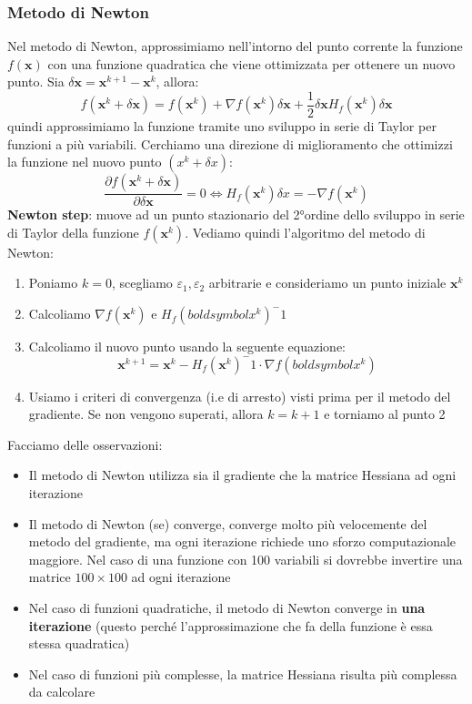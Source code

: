 \documentclass[12pt]{article}
\begin{document}
\subsubsection{Metodo di Newton}
Nel metodo di Newton, approssimiamo nell'intorno del punto corrente la funzione $f(\boldsymbol{x})$ con una funzione quadratica che viene ottimizzata per ottenere un nuovo punto. Sia $\delta \boldsymbol{x} = \boldsymbol{x}^{k+1} - \boldsymbol{x}^k$, allora:
$$f(\boldsymbol{x}^k + \delta \boldsymbol{x}) = f(\boldsymbol{x}^k) + \nabla f(\boldsymbol{x}^k)\delta \boldsymbol{x} + \frac{1}{2}\delta \boldsymbol{x} H_f(\boldsymbol{x}^k)\delta \boldsymbol{x}$$
quindi approssimiamo la funzione tramite uno sviluppo in serie di Taylor per funzioni a più variabili. \newline
Cerchiamo una direzione di miglioramento che ottimizzi la funzione nel nuovo punto $(x^k + \delta x)$:
$$\frac{\partial f(\boldsymbol{x}^k + \delta \boldsymbol{x})}{\partial \delta \boldsymbol{x}} = 0 \Leftrightarrow H_f(\boldsymbol{x}^k)\delta x = -\nabla f(\boldsymbol{x}^k)$$
\textbf{Newton step}: muove ad un punto stazionario del 2°ordine dello sviluppo in serie di Taylor della funzione $f(\boldsymbol{x}^k)$.
Vediamo quindi l'algoritmo del metodo di Newton:
\begin{enumerate}
    \item Poniamo $k = 0$, scegliamo $\varepsilon_1, \varepsilon_2$ arbitrarie e consideriamo un punto iniziale $\boldsymbol{x}^k$
    \item Calcoliamo $\nabla f(\boldsymbol{x}^k)$ e $H_f(boldsymbol{x}^k)^-1$
    \item Calcoliamo il nuovo punto usando la seguente equazione: $$\boldsymbol{x}^{k+1} = \boldsymbol{x}^k - H_f(\boldsymbol{x}^k)^-1 \cdot \nabla f(boldsymbol{x}^k)$$
    \item Usiamo i criteri di convergenza (i.e di arresto) visti prima per il metodo del gradiente. Se non vengono superati, allora $k = k+1$ e torniamo al punto 2
\end{enumerate}
Facciamo delle osservazioni:
\begin{itemize}
    \item Il metodo di Newton utilizza sia il gradiente che la matrice Hessiana ad ogni iterazione
    \item Il metodo di Newton (se) converge, converge molto più velocemente del metodo del gradiente, ma ogni iterazione richiede uno sforzo computazionale maggiore. Nel caso di una funzione con 100 variabili si dovrebbe invertire una matrice $100 \times 100$ ad ogni iterazione
    \item Nel caso di funzioni quadratiche, il metodo di Newton converge in \textbf{una iterazione} (questo perché l'approssimazione che fa della funzione è essa stessa quadratica)
    \item Nel caso di funzioni più complesse, la matrice Hessiana risulta più complessa da calcolare
\end{itemize}
\end{document}
